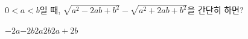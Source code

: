 $0<a<b$일 때, $\sqrt{a^2-2ab+b^2}-\sqrt{a^2+2ab+b^2}$을 간단히 하면?
\begin{choices32}{$-2a$}{$-2b$}{$2a$}{$2b$}{$2a+2b$}\end{choices32}
